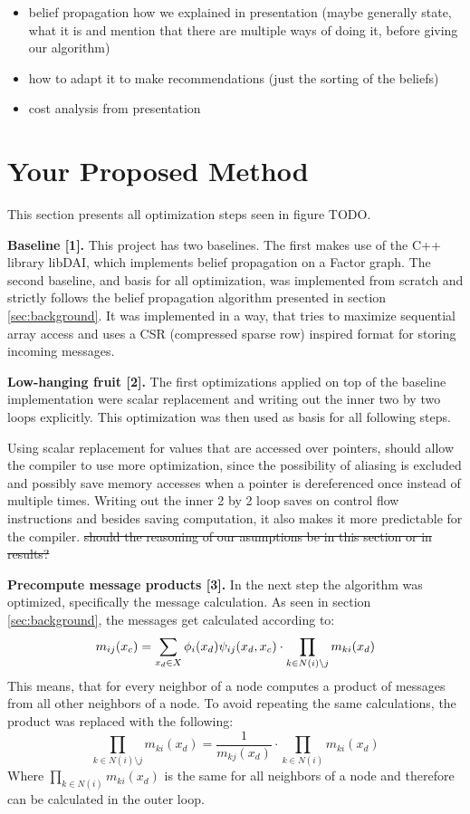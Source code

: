 \documentclass[letterpaper]{article}
\newcommand{\mypar}[1]{{\bf #1.}}
\begin{document}
\begin{itemize}
\item belief propagation how we explained in presentation (maybe generally state, what it is and mention that there are multiple ways of doing it, before giving our algorithm)
\item how to adapt it to make recommendations (just the sorting of the beliefs)
\item cost analysis from presentation
\end{itemize}


\section{Your Proposed Method}\label{sec:yourmethod}

This section presents all optimization steps seen in figure TODO.

\mypar{Baseline [1]}
This project has two baselines. The first makes use of the C++ library libDAI, which implements belief propagation on a Factor graph.
The second baseline, and basis for all optimization, was implemented from scratch and strictly follows the belief propagation algorithm presented in section \ref{sec:background}. It was implemented in a way, that tries to maximize sequential array access and uses a CSR (compressed sparse row) inspired format for storing incoming messages.

\mypar{Low-hanging fruit [2]}
The first optimizations applied on top of the baseline implementation were scalar replacement and writing out the inner two by two loops explicitly.  This optimization was then used as basis for all following steps.

Using scalar replacement for values that are accessed over pointers, should allow the compiler to use more optimization, since the possibility of aliasing is excluded and possibly save memory accesses when a pointer is dereferenced once instead of multiple times.
Writing out the inner 2 by 2 loop saves on control flow instructions and besides saving computation, it also makes it more predictable for the compiler. \st{should the reasoning of our asumptions be in this section or in results?}


\mypar{Precompute message products [3]}
In the next step the algorithm was optimized, specifically the message calculation. As seen in section \ref{sec:background}, the messages get calculated according to:
$$m_{ij}(x_c) = \sum_{x_d \in X} \phi_i(x_d)\psi_{ij}(x_d, x_c) \cdot \prod_{k \in N(i) \setminus j} m_{ki}(x_d)$$
This means, that for every neighbor of a node computes a product of messages from all other neighbors of a node. To avoid repeating the same calculations, the product was replaced with the following:
$$\prod_{k \in N(i) \setminus j} m_{ki}(x_d) = \frac{1}{m_{kj}(x_d)} \cdot \prod_{k \in N(i)} m_{ki}(x_d)$$
Where $\prod_{k \in N(i)} m_{ki}(x_d)$ is the same for all neighbors of a node and therefore can be calculated in the outer loop. 
\end{document}
